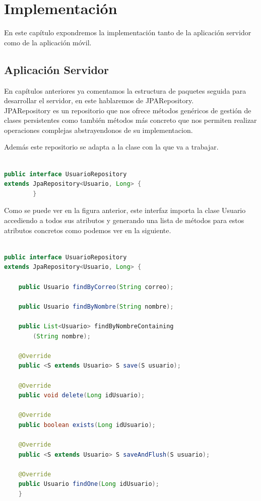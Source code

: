 
\section{Implementación}
En este capítulo expondremos la implementación tanto de la aplicación servidor como de la aplicación móvil.


\subsection{ Aplicación Servidor}
En capítulos anteriores ya comentamos la estructura de paquetes seguida para desarrollar el servidor, en este hablaremos de JPARepository.\\

JPARepository es un repositorio que nos ofrece métodos genéricos de gestión de clases persistentes como también métodos más concreto que nos permiten realizar operaciones complejas abstrayendonos de su implementacion.

Además este repositorio se adapta a la clase con la que va a trabajar.
\begin{lstlisting}[language=java,caption={Adaptación a la clase Usuario },label=DescriptiveLabel]
    
public interface UsuarioRepository 
extends JpaRepository<Usuario, Long> {
		}

\end{lstlisting} 
	




	
Como se puede ver en la figura anterior, este interfaz importa la clase Usuario accediendo a todos sus atributos y generando una lista de métodos para estos atributos concretos como podemos ver en la siguiente.\\

\begin{lstlisting}[language=java,caption={Interfaz  de UsuarioRepository},label=DescriptiveLabel]
    
public interface UsuarioRepository 
extends JpaRepository<Usuario, Long> {

	public Usuario findByCorreo(String correo);

	public Usuario findByNombre(String nombre);

	public List<Usuario> findByNombreContaining
		(String nombre);

	@Override
	public <S extends Usuario> S save(S usuario);

	@Override
	public void delete(Long idUsuario);

	@Override
	public boolean exists(Long idUsuario);

	@Override
	public <S extends Usuario> S saveAndFlush(S usuario);

	@Override
	public Usuario findOne(Long idUsuario);
	}


\end{lstlisting} 

